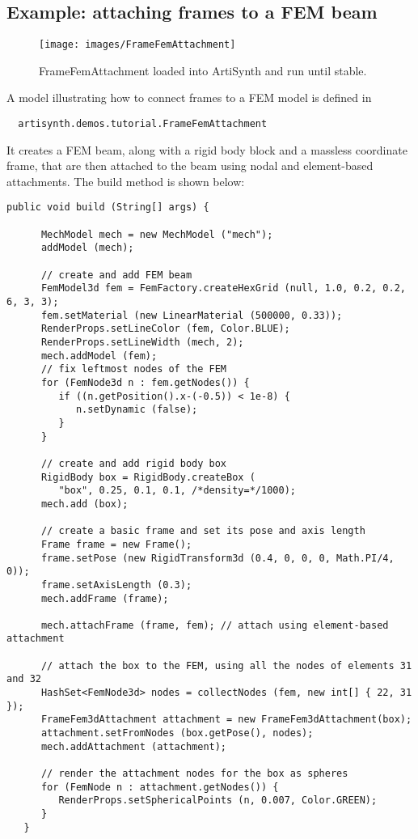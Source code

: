 \subsection{Example: attaching frames to a FEM beam}

\begin{figure}[ht]
	\centering
	\texttt{[image: images/FrameFemAttachment]}
	\caption{FrameFemAttachment loaded into ArtiSynth and run until stable.}
	\label{fig:fem:frameFemAttachment}
\end{figure}

A model illustrating how to connect frames to a FEM model 
is defined in
%
\begin{verbatim}
  artisynth.demos.tutorial.FrameFemAttachment
\end{verbatim}
%
It creates a FEM beam, along with a rigid body block and a 
massless coordinate frame, that are then attached to the beam
using nodal and element-based attachments. The build method is shown below:
\lstset{numbers=left}
\begin{lstlisting}[]
   public void build (String[] args) {

      MechModel mech = new MechModel ("mech");
      addModel (mech);

      // create and add FEM beam 
      FemModel3d fem = FemFactory.createHexGrid (null, 1.0, 0.2, 0.2, 6, 3, 3);
      fem.setMaterial (new LinearMaterial (500000, 0.33));
      RenderProps.setLineColor (fem, Color.BLUE);
      RenderProps.setLineWidth (mech, 2);
      mech.addModel (fem);
      // fix leftmost nodes of the FEM
      for (FemNode3d n : fem.getNodes()) {
         if ((n.getPosition().x-(-0.5)) < 1e-8) {
            n.setDynamic (false);
         }
      }

      // create and add rigid body box
      RigidBody box = RigidBody.createBox (
         "box", 0.25, 0.1, 0.1, /*density=*/1000);
      mech.add (box);

      // create a basic frame and set its pose and axis length
      Frame frame = new Frame();
      frame.setPose (new RigidTransform3d (0.4, 0, 0, 0, Math.PI/4, 0));
      frame.setAxisLength (0.3);
      mech.addFrame (frame);

      mech.attachFrame (frame, fem); // attach using element-based attachment

      // attach the box to the FEM, using all the nodes of elements 31 and 32
      HashSet<FemNode3d> nodes = collectNodes (fem, new int[] { 22, 31 });
      FrameFem3dAttachment attachment = new FrameFem3dAttachment(box);
      attachment.setFromNodes (box.getPose(), nodes);
      mech.addAttachment (attachment);

      // render the attachment nodes for the box as spheres
      for (FemNode n : attachment.getNodes()) {
         RenderProps.setSphericalPoints (n, 0.007, Color.GREEN);
      }
   }
\end{lstlisting}
